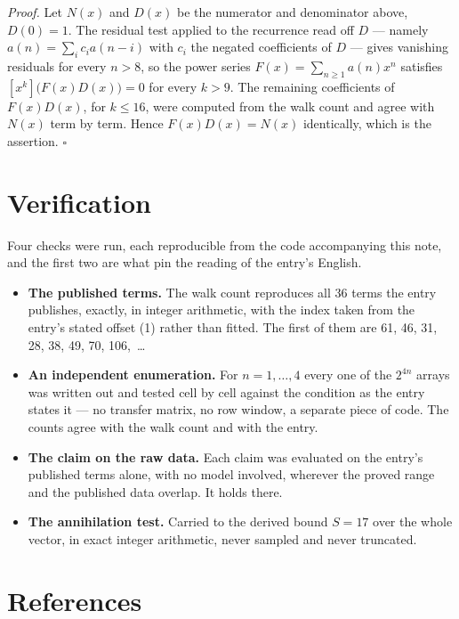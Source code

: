 \documentclass[11pt]{article}
\theoremstyle{definition}
\begin{document}
{\itshape Proof.} Let $N(x)$ and $D(x)$ be the numerator and denominator above, $D(0)=1$. The residual test applied to the recurrence read off $D$ --- namely $a(n) = \sum_i c_i a(n-i)$ with $c_i$ the negated coefficients of $D$ --- gives vanishing residuals for every $n > 8$, so the power series $F(x)=\sum_{n\ge 1}a(n)x^n$ satisfies $[x^k]\bigl(F(x)D(x)\bigr) = 0$ for every $k > 9$. The remaining coefficients of $F(x)D(x)$, for $k \le 16$, were computed from the walk count and agree with $N(x)$ term by term. Hence $F(x)D(x) = N(x)$ identically, which is the assertion. $\square$

\section{Verification}

Four checks were run, each reproducible from the code accompanying this note, and the first two are what pin the reading of the entry's English.

\begin{itemize}

\item {\bfseries The published terms.} The walk count reproduces all 36 terms the entry publishes, exactly, in integer arithmetic, with the index taken from the entry's stated offset (1) rather than fitted. The first of them are 61, 46, 31, 28, 38, 49, 70, 106,~\dots

\item {\bfseries An independent enumeration.} For $n = 1,\dots,4$ every one of the $2^{4n}$ arrays was written out and tested cell by cell against the condition as the entry states it --- no transfer matrix, no row window, a separate piece of code. The counts agree with the walk count and with the entry.

\item {\bfseries The claim on the raw data.} Each claim was evaluated on the entry's published terms alone, with no model involved, wherever the proved range and the published data overlap. It holds there.

\item {\bfseries The annihilation test.} Carried to the derived bound $S = 17$ over the whole vector, in exact integer arithmetic, never sampled and never truncated.

\end{itemize}

\section{References}
\end{document}
